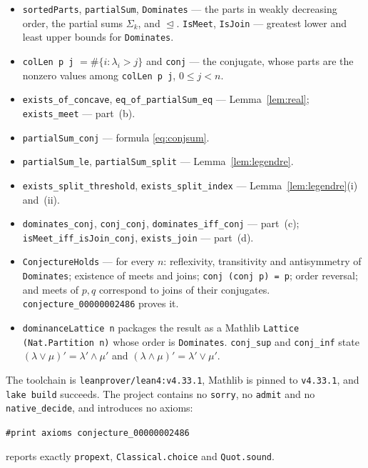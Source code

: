 \documentclass[11pt]{article}
\theoremstyle{plain}
\theoremstyle{definition}
\theoremstyle{remark}
\newcommand{\dom}{\trianglelefteq}
\begin{document}
\begin{itemize}
  \item \texttt{sortedParts}, \texttt{partialSum}, \texttt{Dominates} --- the
    parts in weakly decreasing order, the partial sums $\Sigma_k$, and $\dom$.
    \texttt{IsMeet}, \texttt{IsJoin} --- greatest lower and least upper bounds
    for \texttt{Dominates}.
  \item \texttt{colLen p j} $=\#\{i:\lambda_i>j\}$ and \texttt{conj} --- the
    conjugate, whose parts are the nonzero values among
    \texttt{colLen p j}, $0\le j<n$.
  \item \texttt{exists\_of\_concave}, \texttt{eq\_of\_partialSum\_eq} ---
    Lemma~\ref{lem:real}; \texttt{exists\_meet} --- part~(b).
  \item \texttt{partialSum\_conj} --- formula \eqref{eq:conjsum}.
  \item \texttt{partialSum\_le}, \texttt{partialSum\_split} ---
    Lemma~\ref{lem:legendre}.
  \item \texttt{exists\_split\_threshold}, \texttt{exists\_split\_index}
    --- Lemma~\ref{lem:legendre}(i) and~(ii).
  \item \texttt{dominates\_conj}, \texttt{conj\_conj},
    \texttt{dominates\_iff\_conj} --- part~(c);
    \texttt{isMeet\_iff\_isJoin\_conj}, \texttt{exists\_join} --- part~(d).
  \item \texttt{ConjectureHolds} --- for every $n$: reflexivity, transitivity
    and antisymmetry of \texttt{Dominates}; existence of meets and joins;
    \texttt{conj (conj p) = p}; order reversal; and meets of $p,q$
    correspond to joins of their conjugates.
    \texttt{conjecture\_00000002486} proves it.
  \item \texttt{dominanceLattice n} packages the result as a Mathlib
    \texttt{Lattice (Nat.Partition n)} whose order is \texttt{Dominates}.
    \texttt{conj\_sup} and \texttt{conj\_inf} state
    $(\lambda\vee\mu)'=\lambda'\wedge\mu'$ and
    $(\lambda\wedge\mu)'=\lambda'\vee\mu'$.
\end{itemize}

The toolchain is \texttt{leanprover/lean4:v4.33.1}, Mathlib is pinned to
\texttt{v4.33.1}, and \texttt{lake build} succeeds. The project contains no
\texttt{sorry}, no \texttt{admit} and no \texttt{native\_decide}, and
introduces no axioms:
\begin{center}
\texttt{\#print axioms conjecture\_00000002486}
\end{center}
reports exactly \texttt{propext}, \texttt{Classical.choice} and
\texttt{Quot.sound}.
\end{document}
